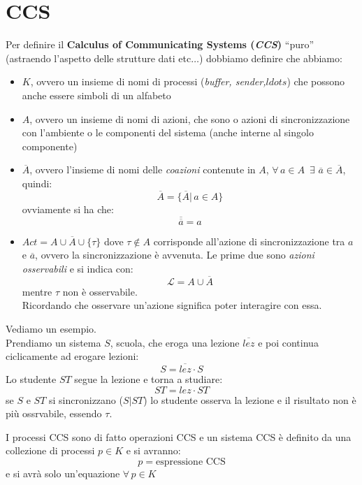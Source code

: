 \section{CCS}
\begin{definizione}
  Per definire il \textbf{Calculus of Communicating Systems (\textit{CCS})}
  ``puro'' (astraendo l'aspetto delle strutture dati etc$\ldots$) dobbiamo
  definire che abbiamo: 
  \begin{itemize}
    \item $K$, ovvero un insieme di nomi di processi (\textit{buffer,
      sender,$ldots$}) che possono anche essere simboli di un alfabeto
    \item $A$, ovvero un insieme di nomi di azioni, che sono o azioni di
    sincronizzazione con l'ambiente o le componenti del sistema (anche interne
    al singolo componente)
    \item $\overline{A}$, ovvero l'insieme di nomi delle \textit{coazioni}
    contenute in $A$, $\forall\, a\in A\,\,\,\exists\,\, \overline{a}\in
    \overline{A}$, quindi:
    \[\overline{A}=\{\overline{A}|\, a\in A\}\]
    ovviamente si ha che:
    \[\overline{\overline{a}}=a\]
    \item $Act=A\cup \overline{A}\cup \{\tau\}$ dove $\tau\not\in A$ corrisponde
    all'azione di sincronizzazione tra $a$ e $\overline{a}$, ovvero la
    sincronizzazione è avvenuta. Le prime due sono \textit{azioni osservabili} e
    si indica con:
    \[\mathcal{L}=A\cup \overline{A}\]
    mentre $\tau$ non è osservabile.\\
    Ricordando che osservare un'azione significa poter interagire con essa.
  \end{itemize}
\end{definizione} \vspace{5mm} %
\begin{esempio}
  Vediamo un esempio.\\
  Prendiamo un sistema $S$, scuola, che eroga una lezione $\overline{lez}$ e poi
  continua ciclicamente ad erogare lezioni:
  \[S=\overline{lez}\cdot S\]
  Lo studente $ST$ segue la lezione e torna a studiare:
  \[ST=lez\cdot ST\] 
  se $S$ e $ST$ si sincronizzano ($S|ST$) lo studente osserva la lezione e il
  risultato non è più ossrvabile, essendo $\tau$.
\end{esempio}
\begin{definizione}
  I processi CCS sono di fatto operazioni CCS e un sistema CCS è definito da una
  collezione di processi $p\in K$ e si avranno:
  \[p=\mbox{espressione CCS}\]
  e si avrà solo un'equazione $\forall\, p\in K$
\end{definizione} \vspace{5mm} %

